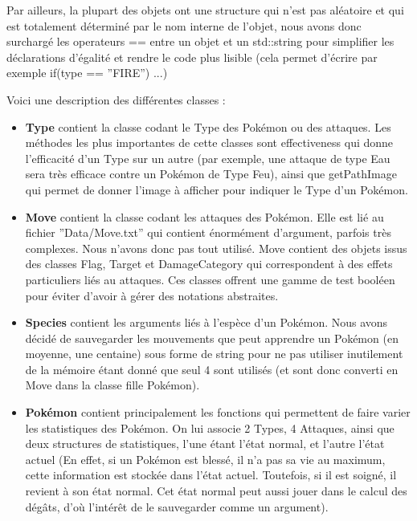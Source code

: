 \documentclass[a4paper,twoside, openany,11pt]{book}
\begin{document}
Par ailleurs, la plupart des objets ont une structure qui n'est pas aléatoire et qui est totalement déterminé par le nom interne de l'objet, nous avons donc surchargé les operateurs == entre un objet et un std::string pour simplifier les déclarations d'égalité et rendre le code plus lisible (cela permet d'écrire par exemple if(type == ''FIRE'') ...)

Voici une description des différentes classes :

\begin{itemize}
\item \textbf{Type} contient la classe codant le Type des Pokémon ou des attaques. Les méthodes les plus importantes de cette classes sont effectiveness qui donne l'efficacité d'un Type sur un autre (par exemple, une attaque de type Eau sera très efficace contre un Pokémon de Type Feu), ainsi que getPathImage qui permet de donner l'image à afficher pour indiquer le Type d'un Pokémon.
\item \textbf{Move} contient la classe codant les attaques des Pokémon. Elle est lié au fichier ''Data/Move.txt'' qui contient énormément d'argument, parfois très complexes. Nous n'avons donc pas tout utilisé. Move contient des objets issus des classes Flag, Target et DamageCategory qui correspondent à des effets particuliers liés au attaques. Ces classes offrent une gamme de test booléen pour éviter d'avoir à gérer des notations abstraites. 
\item  \textbf{Species} contient les arguments liés à l'espèce d'un Pokémon. Nous avons décidé de sauvegarder les mouvements que peut apprendre un Pokémon (en moyenne, une centaine) sous forme de string pour ne pas utiliser inutilement de la mémoire étant donné que seul 4 sont utilisés (et sont donc converti en Move dans la classe fille Pokémon). 
\item  \textbf{Pokémon} contient principalement les fonctions qui permettent de faire varier les statistiques des Pokémon. On lui associe 2 Types, 4 Attaques, ainsi que deux structures de statistiques, l'une étant l'état normal, et l'autre l'état actuel (En effet, si un Pokémon est blessé, il n'a pas sa vie au maximum, cette information est stockée dans l'état actuel. Toutefois, si il est soigné, il revient à son état normal. Cet état normal peut aussi jouer dans le calcul des dégâts, d'où l’intérêt de le sauvegarder comme un argument). 
\end{itemize}
\end{document}
